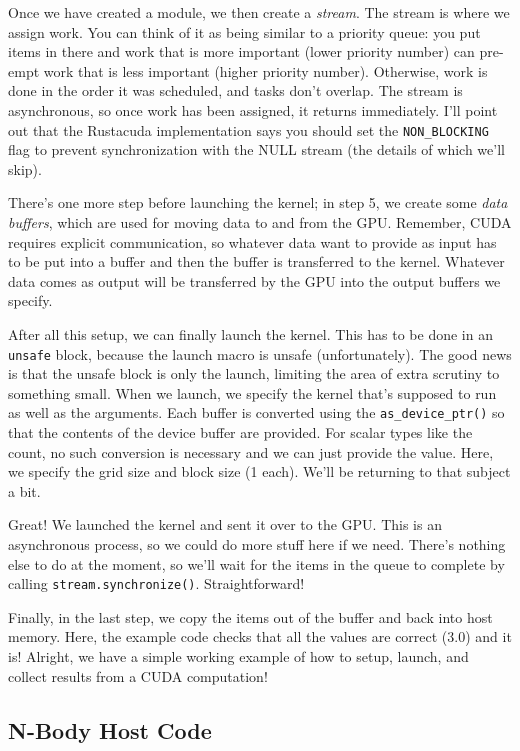 \documentclass[a4paper]{report}
\begin{document}
Once we have created a module, we then create a \textit{stream}. The stream is where we assign work. You can think of it as being similar to a priority queue: you put items in there and work that is more important (lower priority number) can pre-empt work that is less important (higher priority number). Otherwise, work is done in the order it was scheduled, and tasks don't overlap. The stream is asynchronous, so once work has been assigned, it returns immediately. I'll point out that the Rustacuda implementation says you should set the \texttt{NON\_BLOCKING} flag to prevent synchronization with the NULL stream (the details of which we'll skip). 

There's one more step before launching the kernel; in step 5, we
create some \emph{data buffers}, which are used for moving data to and from the GPU. Remember, CUDA requires explicit communication, so whatever data want to provide as input has to be put into a buffer and then the buffer is transferred to the kernel. Whatever data comes as output will be transferred by the GPU into the output buffers we specify.

After all this setup, we can finally launch the kernel. This has to be done in an \texttt{unsafe} block, because the launch macro is unsafe (unfortunately). The good news is that the unsafe block is only the launch, limiting the area of extra scrutiny to something small. When we launch, we specify the kernel that's supposed to run as well as the arguments. Each buffer is converted using the \texttt{as\_device\_ptr()} so that the contents of the device buffer are provided. For scalar types like the count, no such conversion is necessary and we can just provide the value. Here, we specify the grid size and block size (1 each). We'll be returning to that subject a bit.

Great! We launched the kernel and sent it over to the GPU. This is an asynchronous process, so we could do more stuff here if we need. There's nothing else to do at the moment, so we'll wait for the items in the queue to complete by calling \texttt{stream.synchronize()}. Straightforward!

Finally, in the last step, we copy the items out of the buffer and back into host memory. Here, the example code checks that all the values are correct (3.0) and it is! Alright, we have a simple working example of how to setup, launch, and collect results from a CUDA computation!

\subsection*{N-Body Host Code}
\end{document}
